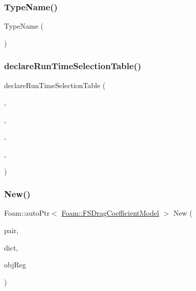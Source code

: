 \subsubsection{\texorpdfstring{Type\+Name()}{TypeName()}}
{\footnotesize\ttfamily Type\+Name (\begin{DoxyParamCaption}\item[{\char`\"{}F\+S\+Drag\+Coefficient\+Model\char`\"{}}]{ }\end{DoxyParamCaption})}

\mbox{\label{classFoam_1_1FSDragCoefficientModel_a2810332651504741c435eda9834ce75d}} 
\subsubsection{\texorpdfstring{declare\+Run\+Time\+Selection\+Table()}{declareRunTimeSelectionTable()}}
{\footnotesize\ttfamily declare\+Run\+Time\+Selection\+Table (\begin{DoxyParamCaption}\item[{auto\+Ptr}]{,  }\item[{\hyperlink{classFoam_1_1FSDragCoefficientModel}{F\+S\+Drag\+Coefficient\+Model}}]{,  }\item[{F\+S\+Drag\+Coefficient\+Models}]{,  }\item[{(const \hyperlink{classFoam_1_1FSPair}{F\+S\+Pair} \&pair, const dictionary \&dict, const object\+Registry \&obj\+Reg)}]{,  }\item[{(pair, dict, obj\+Reg)}]{ }\end{DoxyParamCaption})}

\mbox{\label{classFoam_1_1FSDragCoefficientModel_a96a7d5b462837913e40f9e13072e927c}} 
\subsubsection{\texorpdfstring{New()}{New()}}
{\footnotesize\ttfamily Foam\+::auto\+Ptr$<$ \hyperlink{classFoam_1_1FSDragCoefficientModel}{Foam\+::\+F\+S\+Drag\+Coefficient\+Model} $>$ New (\begin{DoxyParamCaption}\item[{const \hyperlink{classFoam_1_1FSPair}{F\+S\+Pair} \&}]{pair,  }\item[{const dictionary \&}]{dict,  }\item[{const object\+Registry \&}]{obj\+Reg }\end{DoxyParamCaption})\hspace{0.3cm}{\ttfamily [static]}}



